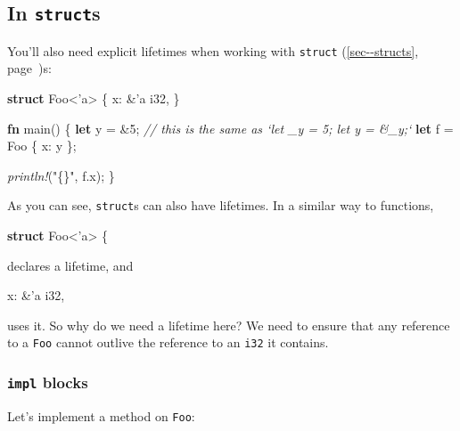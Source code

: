 \documentclass[a4paper,]{book}
\renewcommand*{\hyperref}[2][\ar]{%
  \def\ar{#2}%
  #2 (\autoref{#1}, page~\pageref{#1})}
\newenvironment{Shaded}{\begin{snugshade}}{\end{snugshade}}
\newcommand{\KeywordTok}[1]{\textcolor[rgb]{0.13,0.29,0.53}{\textbf{{#1}}}}
\newcommand{\DataTypeTok}[1]{\textcolor[rgb]{0.13,0.29,0.53}{{#1}}}
\newcommand{\DecValTok}[1]{\textcolor[rgb]{0.00,0.00,0.81}{{#1}}}
\newcommand{\StringTok}[1]{\textcolor[rgb]{0.31,0.60,0.02}{{#1}}}
\newcommand{\CommentTok}[1]{\textcolor[rgb]{0.56,0.35,0.01}{\textit{{#1}}}}
\newcommand{\OtherTok}[1]{\textcolor[rgb]{0.56,0.35,0.01}{{#1}}}
\newcommand{\PreprocessorTok}[1]{\textcolor[rgb]{0.56,0.35,0.01}{\textit{{#1}}}}
\newcommand{\NormalTok}[1]{{#1}}
\begin{document}
\subsection{\texorpdfstring{In
\texttt{struct}s}{In structs}}\label{in-structs}

You'll also need explicit lifetimes when working with
\hyperref[sec--structs]{\texttt{struct}}s:

\begin{Shaded}
\begin{Highlighting}[]
\KeywordTok{struct} \NormalTok{Foo<}\OtherTok{'a}\NormalTok{> \{}
    \NormalTok{x: &}\OtherTok{'a} \DataTypeTok{i32}\NormalTok{,}
\NormalTok{\}}

\KeywordTok{fn} \NormalTok{main() \{}
    \KeywordTok{let} \NormalTok{y = &}\DecValTok{5}\NormalTok{; }\CommentTok{// this is the same as `let _y = 5; let y = &_y;`}
    \KeywordTok{let} \NormalTok{f = Foo \{ x: y \};}

    \PreprocessorTok{println!}\NormalTok{(}\StringTok{"\{\}"}\NormalTok{, f.x);}
\NormalTok{\}}
\end{Highlighting}
\end{Shaded}

As you can see, \texttt{struct}s can also have lifetimes. In a similar
way to functions,

\begin{Shaded}
\begin{Highlighting}[]
\KeywordTok{struct} \NormalTok{Foo<}\OtherTok{'a}\NormalTok{> \{}
\end{Highlighting}
\end{Shaded}

declares a lifetime, and

\begin{Shaded}
\begin{Highlighting}[]
\NormalTok{x: &}\OtherTok{'a} \DataTypeTok{i32}\NormalTok{,}
\end{Highlighting}
\end{Shaded}

uses it. So why do we need a lifetime here? We need to ensure that any
reference to a \texttt{Foo} cannot outlive the reference to an
\texttt{i32} it contains.

\subsubsection{\texorpdfstring{\texttt{impl}
blocks}{impl blocks}}\label{impl-blocks}

Let's implement a method on \texttt{Foo}:
\end{document}
